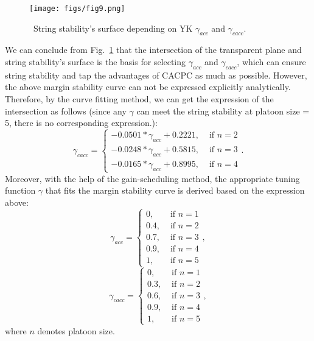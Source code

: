 \documentclass[journal]{IEEEtran}
\begin{document}
\begin{figure}
  \centering
  \texttt{[image: figs/fig9.png]}
  \caption{~String stability's surface depending on YK $\gamma_{acc}$ and $\gamma_{cacc}$.}
  \label{fig9}
\end{figure}
We can conclude from Fig.~\ref{fig9} that the intersection of the transparent plane and string stability's surface is the basis for selecting $\gamma_{acc}$ and $\gamma_{cacc}$, which can ensure string stability and tap the advantages of CACPC as much as possible. However, the above margin stability curve can not be expressed explicitly analytically. Therefore, by the curve fitting method, we can get the expression of the intersection as follows (since any $\gamma$ can meet the string stability at platoon size = 5, there is no corresponding expression.):
\begin{equation}
  \gamma_{c a c c}= \begin{cases}-0.0501 * \gamma_{a c c}+0.2221 ,& \text { if } n=2 \\ -0.0248 * \gamma_{a c c}+0.5815 ,& \text { if } n=3 \\ -0.0165 * \gamma_{a c c}+0.8995 ,& \text { if } n=4\end{cases}.
\end{equation}
Moreover, with the help of the gain-scheduling method, the appropriate tuning function $\gamma$ that fits the margin stability curve is derived based on the expression above:
\begin{equation}
  \gamma_{a c c}=\left\{\begin{array}{cc}
    0 ,   & \text { if } n=1 \\
    0.4 , & \text { if } n=2 \\
    0.7 , & \text { if } n=3 \\
    0.9 , & \text { if } n=4 \\
    1 ,   & \text { if } n=5
  \end{array}\right.,
\end{equation}
\begin{equation}
  \gamma_{c a c c}=\left\{\begin{array}{cc}
    0 ,   & \text { if } n=1 \\
    0.3 , & \text { if } n=2 \\
    0.6 , & \text { if } n=3 \\
    0.9 , & \text { if } n=4 \\
    1 ,   & \text { if } n=5
  \end{array}\right.,
\end{equation}
where $n$ denotes platoon size.
\end{document}
